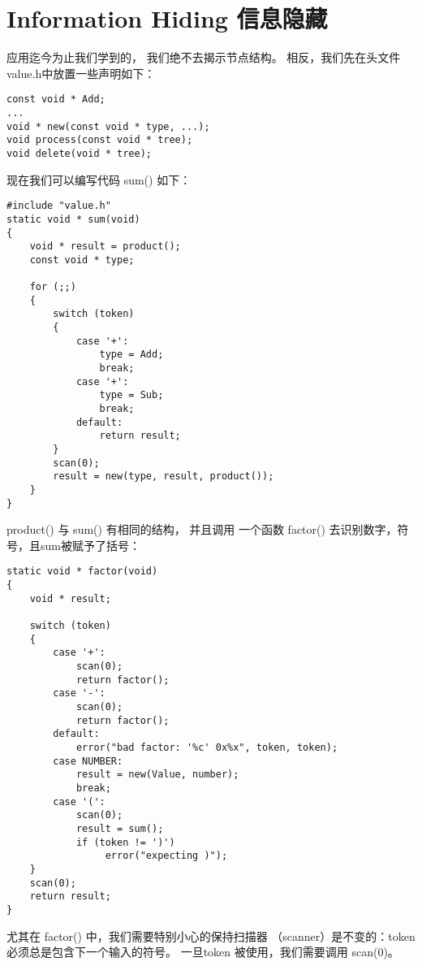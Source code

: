 \section{Information Hiding 信息隐藏}
应用迄今为止我们学到的，
我们绝不去揭示节点结构。
相反，我们先在头文件 value.h中放置一些声明如下：
\begin{lstlisting}
const void * Add;
...
void * new(const void * type, ...);
void process(const void * tree);
void delete(void * tree);
\end{lstlisting}

现在我们可以编写代码 sum() 如下：
\begin{lstlisting}
#include "value.h"
static void * sum(void)
{
    void * result = product();
    const void * type;
    
    for (;;)
    {
        switch (token)
        {
            case '+':
                type = Add;
                break;
            case '+':
                type = Sub;
                break;
            default:
                return result;
        }
        scan(0);
        result = new(type, result, product());
    }
}
\end{lstlisting}

product() 与 sum() 有相同的结构，
并且调用 一个函数 factor() 去识别数字，符号，且sum被赋予了括号：
\begin{lstlisting}
static void * factor(void)
{
    void * result;
    
    switch (token)
    {
        case '+':
            scan(0);
            return factor();
        case '-':
            scan(0);
            return factor();
        default:
            error("bad factor: '%c' 0x%x", token, token);
        case NUMBER:
            result = new(Value, number);
            break;
        case '(':
            scan(0);
            result = sum();
            if (token != ')')
                 error("expecting )");
    }
    scan(0);
    return result;
}
\end{lstlisting}

尤其在 factor() 中，我们需要特别小心的保持扫描器
（scanner）是不变的：token 必须总是包含下一个输入的符号。
一旦token 被使用，我们需要调用 scan(0)。

